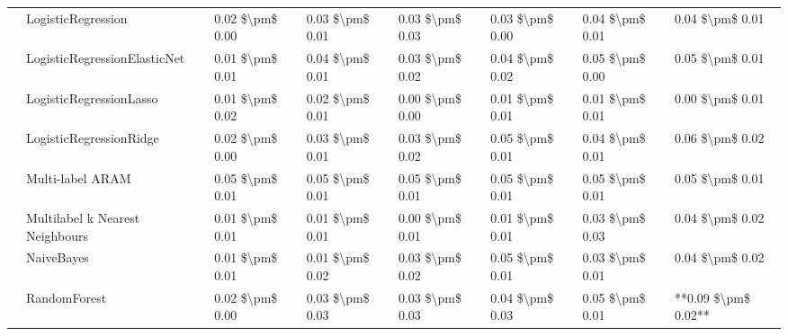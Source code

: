 \begin{tabular}{llllllll}
   & LogisticRegression &  0.02 \$\textbackslash pm\$ 0.00 &           0.03 \$\textbackslash pm\$ 0.01 &       0.03 \$\textbackslash pm\$ 0.03 &        0.03 \$\textbackslash pm\$ 0.00 &                         0.04 \$\textbackslash pm\$ 0.01 &      0.04 \$\textbackslash pm\$ 0.01 \\
   & LogisticRegressionElasticNet &  0.01 \$\textbackslash pm\$ 0.01 &           0.04 \$\textbackslash pm\$ 0.01 &       0.03 \$\textbackslash pm\$ 0.02 &        0.04 \$\textbackslash pm\$ 0.02 &                         0.05 \$\textbackslash pm\$ 0.00 &      0.05 \$\textbackslash pm\$ 0.01 \\
   & LogisticRegressionLasso &  0.01 \$\textbackslash pm\$ 0.02 &           0.02 \$\textbackslash pm\$ 0.01 &       0.00 \$\textbackslash pm\$ 0.00 &        0.01 \$\textbackslash pm\$ 0.01 &                         0.01 \$\textbackslash pm\$ 0.01 &      0.00 \$\textbackslash pm\$ 0.01 \\
   & LogisticRegressionRidge &  0.02 \$\textbackslash pm\$ 0.00 &           0.03 \$\textbackslash pm\$ 0.01 &       0.03 \$\textbackslash pm\$ 0.02 &        0.05 \$\textbackslash pm\$ 0.01 &                         0.04 \$\textbackslash pm\$ 0.01 &      0.06 \$\textbackslash pm\$ 0.02 \\
   & Multi-label ARAM &  0.05 \$\textbackslash pm\$ 0.01 &           0.05 \$\textbackslash pm\$ 0.01 &       0.05 \$\textbackslash pm\$ 0.01 &        0.05 \$\textbackslash pm\$ 0.01 &                         0.05 \$\textbackslash pm\$ 0.01 &      0.05 \$\textbackslash pm\$ 0.01 \\
   & Multilabel k Nearest Neighbours &  0.01 \$\textbackslash pm\$ 0.01 &           0.01 \$\textbackslash pm\$ 0.01 &       0.00 \$\textbackslash pm\$ 0.01 &        0.01 \$\textbackslash pm\$ 0.01 &                         0.03 \$\textbackslash pm\$ 0.03 &      0.04 \$\textbackslash pm\$ 0.02 \\
   & NaiveBayes &  0.01 \$\textbackslash pm\$ 0.01 &           0.01 \$\textbackslash pm\$ 0.02 &       0.03 \$\textbackslash pm\$ 0.02 &        0.05 \$\textbackslash pm\$ 0.01 &                         0.03 \$\textbackslash pm\$ 0.01 &      0.04 \$\textbackslash pm\$ 0.02 \\
   & RandomForest &  0.02 \$\textbackslash pm\$ 0.00 &           0.03 \$\textbackslash pm\$ 0.03 &       0.03 \$\textbackslash pm\$ 0.03 &        0.04 \$\textbackslash pm\$ 0.03 &                         0.05 \$\textbackslash pm\$ 0.01 &  **0.09 \$\textbackslash pm\$ 0.02** \\

\end{tabular}
